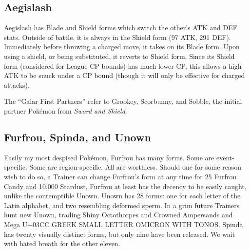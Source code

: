 \subsection{Aegislash\label{sec:aegislash}}
Aegislash has Blade and Shield forms which switch the other's ATK and DEF stats.
Outside of battle, it is always in the Shield form (97 ATK, 291 DEF).
Immediately before throwing a charged move, it takes on its Blade form.
Upon using a shield, or being substituted, it reverts to Shield form.
Since its Shield form (considered for League CP bounds) has much lower CP,
 this allows a high ATK to be snuck under a CP bound (though it will only
 be effective for charged attacks).

\begin{tipbox}[title=Galar First Partners]
The ``Galar First Partners'' refer to Grookey, Scorbunny, and Sobble, the
initial partner Pokémon from \textit{Sword and Shield}.
\end{tipbox}

\subsection{Furfrou, Spinda, and Unown\label{subsec:furfrou}}
Easily my most despised Pokémon, Furfrou has many forms.
Some are event-specific.
Some are region-specific.
All are worthless.
Should one for some reason wish to do so, a Trainer can change Furfrou's form
  at any time for 25 Furfrou Candy and 10,000 Stardust,
Furfrou at least has the decency to be easily caught, unlike the contemptible Unown.
Unown has 28 forms: one for each letter of the Latin alphabet, and two
  resembling deformed sperm.
In a grim future Trainers hunt new Unown, trading Shiny Octothorpes and
  Crowned Ampersands and Mega U+03CC GREEK SMALL LETTER OMICRON WITH TONOS.
Spinda has twenty visually distinct forms, but only nine have been released.
We wait with bated breath for the other eleven.


